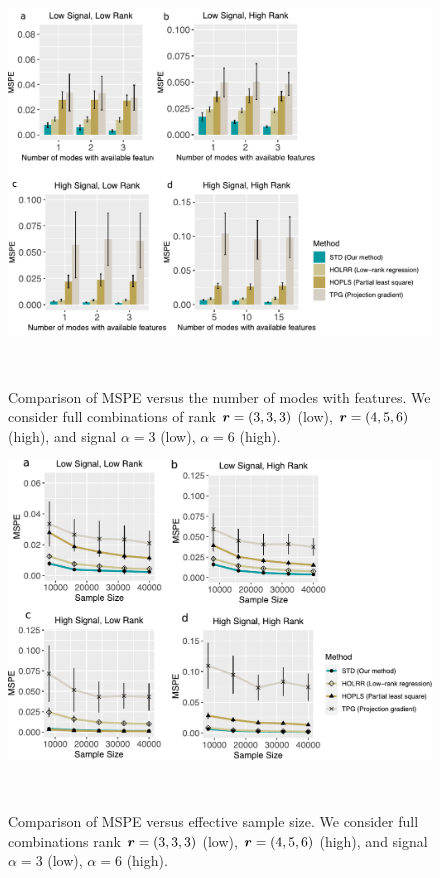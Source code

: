 \documentclass[12pt]{article}
\theoremstyle{definition}
\theoremstyle{definition}
\begin{document}
\begin{figure}[!h]
\centering
\includegraphics[width=16cm]{Supp_Figure1.pdf} 
\caption{Comparison of MSPE versus the number of modes with features. We consider full combinations of rank $\bm{r}=(3,3,3)$ (low), $\bm{r}=(4,5,6)$ (high), and signal $\alpha=3$ (low), $\alpha=6$ (high).}~\label{fig:S1}
\end{figure}


\begin{figure}[!h]
\centering
\includegraphics[width=16cm]{Supp_Figure2.pdf} 
\caption{Comparison of MSPE versus effective sample size. We consider full combinations rank $\bm{r}=(3,3,3)$ (low), $\bm{r}=(4,5,6)$ (high), and signal $\alpha=3$ (low), $\alpha=6$ (high). }~\label{fig:S2}
\end{figure}





\end{document}
